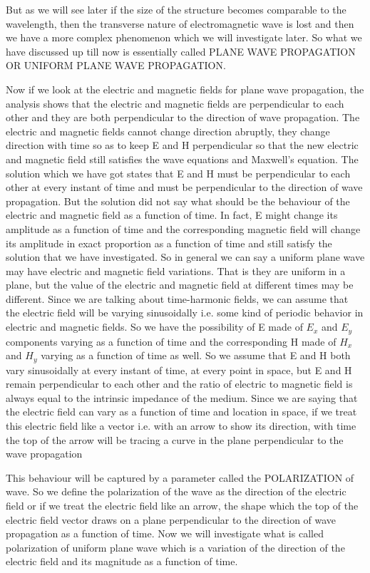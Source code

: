 But as we will see later if the size of the structure becomes comparable to the wavelength, then the transverse nature of electromagnetic wave is lost and then we have a more complex phenomenon which we will investigate later. So what we have discussed up till now is essentially called PLANE WAVE PROPAGATION OR UNIFORM PLANE WAVE PROPAGATION.

Now if we look at the electric and magnetic fields for plane wave propagation, the analysis shows that the electric and magnetic fields are perpendicular to each other and they are both perpendicular to the direction of wave propagation. The electric and magnetic fields cannot change direction abruptly, they change direction with time so as to keep E and H perpendicular so that the new electric and magnetic field still satisfies the wave equations and Maxwell's equation. The solution which we have got states that E and H must be perpendicular to each other at every instant of time and must be perpendicular to the direction of wave propagation. But the solution did not say what should be the behaviour of the electric and magnetic field as a function of time. In fact, E might change its amplitude as a function of time and the corresponding magnetic field will change its amplitude in exact proportion as a function of time and still satisfy the solution that we have investigated. So in general we can say a uniform plane wave may have electric and magnetic field variations. That is they are uniform in a plane, but the value of the electric and magnetic field at different times may be different. Since we are talking about time-harmonic fields, we can assume that the electric field will be varying sinusoidally i.e. some kind of periodic behavior in electric and magnetic fields. So we have the possibility of E made of $E_x$ and $E_y$ components varying as a function of time and the corresponding H made of $H_x$ and $H_y$ varying as a function of time as well. So we assume that E and H both vary sinusoidally at every instant of time, at every point in space, but E and H remain perpendicular to each other and the ratio of electric to magnetic field is always equal to the intrinsic impedance of the medium. 
Since we are saying that the electric field can vary as a function of time and location in space, if we treat this electric field like a vector i.e. with an arrow to show its direction, with time the top of the arrow will be tracing a curve in the plane perpendicular to the wave propagation

This behaviour will be captured by a parameter called the POLARIZATION of wave. So we define the polarization of the wave as the direction of the electric field or if we treat the electric field like an arrow, the shape which the top of the electric field vector draws on a plane perpendicular to the direction of wave propagation as a function of time. Now we will investigate what is called polarization of uniform plane wave which is a variation of the direction of the electric field and its magnitude as a function of time.

